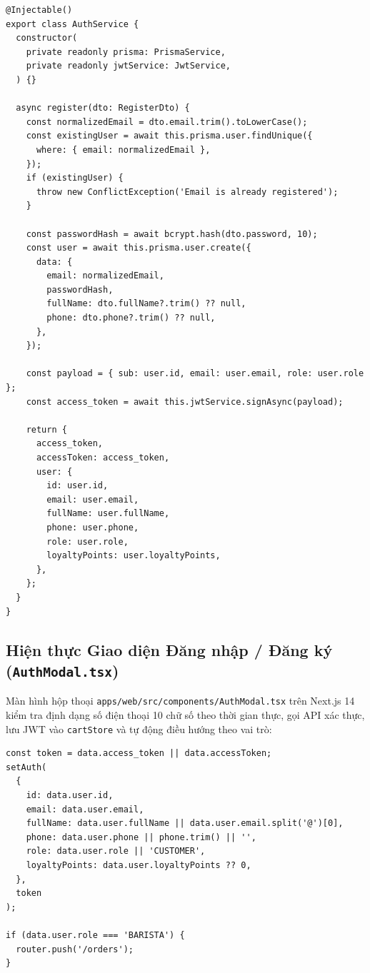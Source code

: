 \documentclass[a4paper]{article}
\begin{document}
\begin{lstlisting}[caption={Hiện thực đăng ký, băm mật khẩu Bcrypt và đăng nhập JWT tại AuthService}]
@Injectable()
export class AuthService {
  constructor(
    private readonly prisma: PrismaService,
    private readonly jwtService: JwtService,
  ) {}

  async register(dto: RegisterDto) {
    const normalizedEmail = dto.email.trim().toLowerCase();
    const existingUser = await this.prisma.user.findUnique({
      where: { email: normalizedEmail },
    });
    if (existingUser) {
      throw new ConflictException('Email is already registered');
    }

    const passwordHash = await bcrypt.hash(dto.password, 10);
    const user = await this.prisma.user.create({
      data: {
        email: normalizedEmail,
        passwordHash,
        fullName: dto.fullName?.trim() ?? null,
        phone: dto.phone?.trim() ?? null,
      },
    });

    const payload = { sub: user.id, email: user.email, role: user.role };
    const access_token = await this.jwtService.signAsync(payload);

    return {
      access_token,
      accessToken: access_token,
      user: {
        id: user.id,
        email: user.email,
        fullName: user.fullName,
        phone: user.phone,
        role: user.role,
        loyaltyPoints: user.loyaltyPoints,
      },
    };
  }
}
\end{lstlisting}

\subsection{Hiện thực Giao diện Đăng nhập / Đăng ký (\texttt{AuthModal.tsx})}
Màn hình hộp thoại \nolinkurl{apps/web/src/components/AuthModal.tsx} trên Next.js 14 kiểm tra định dạng số điện thoại 10 chữ số theo thời gian thực, gọi API xác thực, lưu JWT vào \texttt{cartStore} và tự động điều hướng theo vai trò:

\begin{lstlisting}[caption={Kiểm tra định dạng SĐT 10 chữ số và lưu phiên JWT trong AuthModal.tsx}]
const token = data.access_token || data.accessToken;
setAuth(
  {
    id: data.user.id,
    email: data.user.email,
    fullName: data.user.fullName || data.user.email.split('@')[0],
    phone: data.user.phone || phone.trim() || '',
    role: data.user.role || 'CUSTOMER',
    loyaltyPoints: data.user.loyaltyPoints ?? 0,
  },
  token
);

if (data.user.role === 'BARISTA') {
  router.push('/orders');
}
\end{lstlisting}
\end{document}
